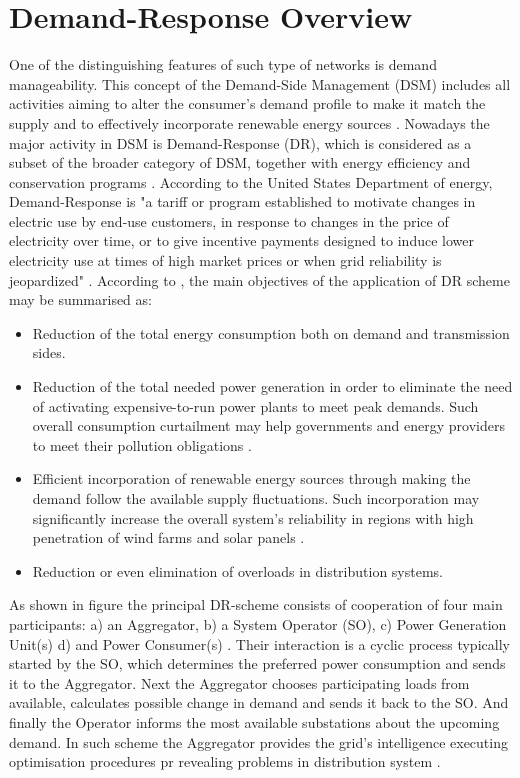 \section{Demand-Response Overview}


One of the distinguishing features of such type of networks is demand manageability. This concept of the Demand-Side Management (DSM) includes all activities aiming to alter the consumer's demand profile to make it match the supply and to effectively incorporate renewable energy sources \cite{Alizadeh2012}. Nowadays the major activity in DSM is Demand-Response (DR), which is considered as a subset of the broader category of DSM, together with energy efficiency and conservation programs \cite{Palensky2011}. According to the United States Department of energy, Demand-Response is "a tariff or program established to motivate changes in electric use by end-use customers, in response to changes in the price of electricity over time, or to give incentive payments designed to induce lower electricity use at times of high market prices or when grid reliability is jeopardized" \cite{DepartmentofEnergyUSA2006}. According to \cite{Vardakas2015}, the main objectives of the application of DR scheme may be summarised as:
\begin{itemize}
    \item Reduction of the total energy consumption both on demand and transmission sides.
    \item Reduction of the total needed power generation in order to eliminate the need of activating expensive-to-run power plants to meet peak demands. Such overall consumption curtailment may help governments and energy providers to meet their pollution obligations \cite{DepartmentofEnergyUSA2006, Shishlov2016, UnitedNations/FrameworkConventiononClimateChange2015}.
    \item Efficient incorporation of renewable energy sources through making the demand follow the available supply fluctuations. Such incorporation may significantly increase the overall system's reliability in regions with high penetration of wind farms and solar panels \cite{Santacana2010}. 
    \item Reduction or even elimination of overloads in distribution systems.
\end{itemize} 

As shown in figure  the principal DR-scheme consists of cooperation of four main participants: a) an Aggregator, b) a System Operator (SO), c) Power Generation Unit(s) d) and Power Consumer(s) \cite{Medina2010}. Their interaction is a cyclic process typically started by the SO, which determines the preferred power consumption and sends it to the Aggregator. Next the Aggregator chooses participating loads from available, calculates possible change in demand and sends it back to the SO. And finally the Operator informs the most available substations about the upcoming demand. In such scheme the Aggregator provides the grid's intelligence executing optimisation procedures pr revealing problems in distribution system \cite{Vardakas2015}. 

